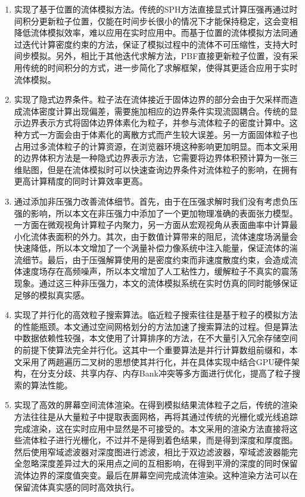     \begin{enumerate}
    	\item 实现了基于位置的流体模拟方法。传统的SPH方法直接显式计算压强再通过时间积分更新粒子位置，仅能在时间步长很小的情况下才能保持稳定，这会变相降低流体模拟效率，难以应用在实时应用中。而基于位置的流体模拟方法同通过迭代计算密度约束的方法，保证了模拟过程中的流体不可压缩性，支持大时间步模拟。另外，相比于其他迭代求解方法，PBF直接更新粒子位置，没有采用传统的时间积分的方式，进一步简化了求解框架，使得其更适合应用于实时流体模拟。
    	\item 实现了隐式边界条件。粒子法在流体接近于固体边界的部分会由于欠采样而造成流体密度计算出现偏差，需要施加相应的边界条件实现流固耦合。传统的显示边界表示方式将固体边界体素化为粒子，并参与流体粒子的密度计算中。这种方式一方面会由于体素化的离散方式而产生较大误差。另一方面固体粒子也占用过多流体粒子的计算资源，在浏览器环境这种影响更加明显。而本文采用的边界体积方法是一种隐式边界表示方法，它需要将边界体积预计算为一张三维贴图，但是在流体模拟时可以快速查询边界条件对流体粒子的影响，在拥有更高计算精度的同时计算效率更高。
    	\item 通过添加非压强力改善流体细节。首先，由于在压强求解时我们没有考虑负压强的影响，所以本文在非压强力中添加了一个更加物理准确的表面张力模型。一方面在微观视角计算粒子内聚力，另一方面从宏观视角从表面曲率中计算最小化流体表面积的外力。其次，由于数值计算带来的阻尼，流体速度场涡量会快速降低，所以本文增加了一个涡量补偿力像系统中注入能量，保证流体的湍流细节。最后，由于压强解算使用的是密度约束而非速度散度约束，会造成流体速度场存在高频噪声，所以本文增加了人工粘性力，缓解粒子不真实的震荡现象。通过这三种非压强力，本文的流体模拟系统在实时仿真的同时能够保证足够的模拟真实感。
    	\item 实现了并行化的高效粒子搜索算法。临近粒子搜索往往是基于粒子的模拟方法的性能瓶颈。本文通过空间网格划分的方法加速了搜索算法的过程。但是算法中数据依赖性较强，本文使用了计算排序的方法，在不大量引入冗余存储空间的前提下使算法完全并行化。这其中一个重要算法是并行计算数组前缀和，本文采用了两趟遍历二叉树的思想使其并行化，并在具体实现中结合GPU硬件架构，在分支分歧、共享内存、内存Bank冲突等多方面进行优化，提高了粒子搜索的算法性能。
    	\item 实现了高效的屏幕空间流体渲染。在得到模拟结果流体粒子之后，传统的渲染方法往往是从大量粒子中提取表面网格，再将其通过传统的光栅化或光线追踪完成渲染，这在实时应用中显然是不可接受的。本文采用的渲染方法直接将这些流体粒子进行光栅化，不过并不是得到着色结果，而是得到深度和厚度图。然后使用窄域滤波器对深度图进行滤波，相比于双边滤波器，窄域滤波器能完全忽略深度差异过大的采用点之间的互相影响，在得到平滑的深度的同时保留流体边界的深度值突变。最后在屏幕空间完成流体渲染。这种渲染方法可以在保留流体真实感的同时高效执行。

\end{enumerate}
